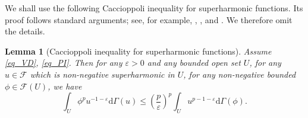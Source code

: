 \documentclass[11pt,a4paper]{article}
\numberwithin{equation}{section}
\theoremstyle{plain}
\newtheorem{lemma}[theorem]{Lemma}
\theoremstyle{definition}
\begin{document}
We shall use the following Caccioppoli inequality for superharmonic functions. Its proof follows standard arguments; see, for example, \cite[Lemma 3.57]{HKM06}, \cite[Lemma 3.1]{KM03}, and \cite[Proposition 8.8]{BB11}. We therefore omit the details.

\begin{lemma}[Caccioppoli inequality for superharmonic functions]\label{lem_Cacci_super}
Assume \ref{eq_VD}, \ref{eq_PI}. Then for any $\varepsilon>0$ and any bounded open set $U$, for any $u\in \mathcal{F}$ which is non-negative superharmonic in $U$, for any non-negative bounded $\phi\in \mathcal{F}(U)$, we have
$$\int_{U}\phi^pu^{-1-\varepsilon} \mathrm{d}\Gamma(u)\le \left(\frac{p}{\varepsilon}\right)^p\int_{U}u^{p-1-\varepsilon}\mathrm{d}\Gamma(\phi).$$
\end{lemma}
\end{document}
